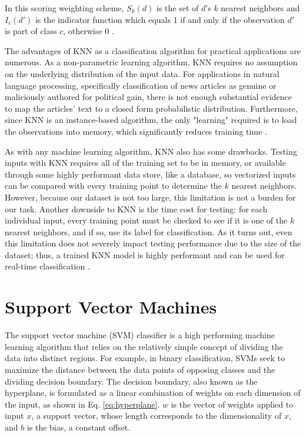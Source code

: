 In this scoring weighting scheme, $S_{k}(d)$ is the set of $d$'s $k$ nearest neighbors and $I_{c}(d')$ is the indicator function which equals 1 if and only if the observation $d'$ is part of class $c$, otherwise 0 \cite{knnIR}.

The advantages of KNN as a classification algorithm for practical applications are numerous.  As a non-parametric learning algorithm, KNN requires no assumption on the underlying distribution of the input data.  For applications in natural language processing, specifically classification of news articles as genuine or maliciously authored for political gain, there is not enough substantial evidence to map the articles' text to a closed form probabilistic distribution.  Furthermore, since KNN is an instance-based algorithm, the only "learning" required is to load the observations into memory, which significantly reduces training time \cite{knnGuide}.

As with any machine learning algorithm, KNN also has some drawbacks.  Testing inputs with KNN requires all of the training set to be in memory, or available through some highly performant data store, like a database, so vectorized inputs can be compared with every training point to determine the $k$ nearest neighbors.   However, because our dataset is not too large, this limitation is not a burden for our task.  Another downside to KNN is the time cost for testing: for each individual input, every training point must be checked to see if it is one of the $k$ nearest neighbors, and if so, use its label for classification.  As it turns out, even this limitation does not severely impact testing performance due to the size of the dataset; thus, a trained KNN model is highly performant and can be used for real-time classification \cite{knnGuide}.


\section{Support Vector Machines} \label{svmSection}

The support vector machine (SVM) classifier is a high performing machine learning algorithm that relies on the relatively simple concept of dividing the data into distinct regions.  For example, in binary classification, SVMs seek to maximize the distance between the data points of opposing classes and the dividing decision boundary.   The decision boundary, also known as the hyperplane, is formulated as a linear combination of weights on each dimension of the input, as shown in Eq. \ref{eq:hyperplane}.  $w$ is the vector of weights applied to input $x$, a support vector, whose length corresponds to the dimensionality of $x$, and $b$ is the bias, a constant offset.


